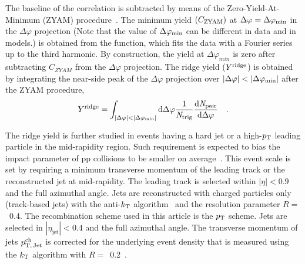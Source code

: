 The baseline of the correlation is subtracted by means of the Zero-Yield-At-Minimum (ZYAM) procedure~\cite{Ajitanand:2005jj}. The minimum yield $(C_{\rm{ZYAM}})$ at $\Delta\varphi=\Delta\varphi_{\rm{min}}$ in the $\Delta\varphi$ projection (Note that the value of $\Delta\varphi_{\rm{min}}$ can be different in data and in models.) is obtained from the function, which fits the data with a Fourier series up to the third harmonic. By construction, the yield at $\Delta\varphi_{min}$ is zero after subtracting $C_{ZYAM}$ from the $\Delta\varphi$ projection. The ridge yield ($Y^{\rm{ridge}}$) is obtained by integrating the near-side peak of the $\Delta\varphi$ projection over $|\Delta\varphi|<|\Delta\varphi_{\rm{min}}|$ after the ZYAM procedure,
\begin{eqnarray}
Y^{\rm{ridge}} = \int_{|\Delta \varphi| < |\Delta\varphi_{\rm{min}}| } \rm{d} \Delta\varphi \frac{1}{\it{N}_{\rm{trig}}} \frac{ \rm{d}\it{}N_{\rm{pair}} }{ \rm{d}\Delta\varphi } \quad.
\end{eqnarray}

The ridge yield is further studied in events having a hard jet or a high-$p_\mathrm{T}$ leading particle in the mid-rapidity region. Such requirement is expected to bias the impact parameter of pp collisions to be smaller on average~\cite{Sjostrand:1986ep,Frankfurt:2010ea}.
This event scale is set by requiring a minimum transverse momentum of the leading track or the reconstructed jet at mid-rapidity. The leading track is selected within $|\eta|<0.9$ and the full azimuthal angle. Jets are reconstructed with charged particles only (track-based jets) with the anti-$k_{\rm{T}}$ algorithm~\cite{Cacciari2008:FASTJET,Cacciari2012:FASTJET} and the resolution parameter $R=$~0.4. The recombination scheme used in this article is the $p_\mathrm{T}$ scheme. Jets are selected in $|\eta_\mathrm{jet}|<0.4$ and the full azimuthal angle. The transverse momentum of jets $p_\mathrm{T,\,Jet}^\mathrm{ch}$ is corrected for the underlying event density that is measured using the $k_{\rm{T}}$ algorithm with $R=$~0.2~\cite{ALICE2019:KTJETSub}. 

